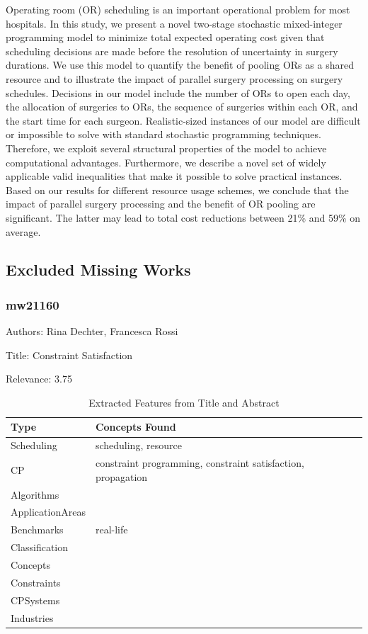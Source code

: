   Operating room (OR) scheduling is an important operational problem for most hospitals. In this study, we present a novel two-stage stochastic mixed-integer programming model to minimize total expected operating cost given that scheduling decisions are made before the resolution of uncertainty in surgery durations. We use this model to quantify the benefit of pooling ORs as a shared resource and to illustrate the impact of parallel surgery processing on surgery schedules. Decisions in our model include the number of ORs to open each day, the allocation of surgeries to ORs, the sequence of surgeries within each OR, and the start time for each surgeon. Realistic-sized instances of our model are difficult or impossible to solve with standard stochastic programming techniques. Therefore, we exploit several structural properties of the model to achieve computational advantages. Furthermore, we describe a novel set of widely applicable valid inequalities that make it possible to solve practical instances. Based on our results for different resource usage schemes, we conclude that the impact of parallel surgery processing and the benefit of OR pooling are significant. The latter may lead to total cost reductions between 21\% and 59\% on average.  

\subsection{Excluded Missing Works}

\subsubsection{mw21160}
\label{mw:mw21160}

Authors: Rina Dechter, Francesca Rossi

Title: Constraint Satisfaction

Relevance:  3.75

{\scriptsize
\begin{longtable}{p{2cm}p{20cm}}
\caption{Extracted Features from Title and Abstract}\\ \toprule
Type & Concepts Found\\ \midrule
\endhead
\bottomrule
\endfoot
Scheduling & scheduling, resource\\ 
CP & constraint programming, constraint satisfaction, propagation\\ 
Algorithms & \\ 
ApplicationAreas & \\ 
Benchmarks & real-life\\ 
Classification & \\ 
Concepts & \\ 
Constraints & \\ 
CPSystems & \\ 
Industries & \\ 
\end{longtable}
}

